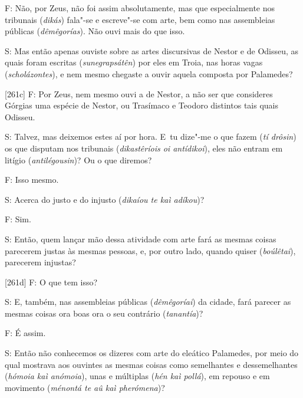  

F: Não, por Zeus, não foi assim absolutamente, mas que especialmente nos
tribunais (\emph{dikás}) fala"-se e escreve"-se com arte, bem como nas
assembleias públicas (\emph{dêmêgorías}). Não ouvi mais do que isso.

 

S: Mas então apenas ouviste sobre as artes discursivas de Nestor e de
Odisseu, as quais foram escritas (\emph{sunegrapsátên}) por eles em
Troia, nas horas vagas (\emph{scholázontes}), e nem mesmo chegaste a
ouvir aquela composta por Palamedes?

 

[261c] F: Por Zeus, nem mesmo ouvi a de Nestor, a não ser que
consideres Górgias uma espécie de Nestor, ou Trasímaco e Teodoro
distintos tais quais Odisseu.

 

S: Talvez, mas deixemos estes aí por hora. E~tu dize"-me o que fazem
(\emph{tí drôsin}) os que disputam nos tribunais (\emph{dikastêríois oi
antídikoi}), eles não entram em litígio (\emph{antilégousin})? Ou o que
diremos?

 

F: Isso mesmo.

 

S: Acerca do justo e do injusto (\emph{dikaíou te kaì adíkou})?

 

F: Sim.

 

S: Então, quem lançar mão dessa atividade com arte fará as mesmas coisas
parecerem justas às mesmas pessoas, e, por outro lado, quando quiser
(\emph{boúlêtai}), parecerem injustas?

 

[261d] F: O que tem isso?

 

S: E, também, nas assembleias públicas (\emph{dêmêgoríai}) da cidade,
fará parecer as mesmas coisas ora boas ora o seu contrário
(\emph{tanantía})?

 

F: É assim.

 

S: Então não conhecemos os dizeres com arte do eleático Palamedes, por
meio do qual mostrava aos ouvintes as mesmas coisas como semelhantes e
dessemelhantes (\emph{hómoia kaì anómoia}), unas e múltiplas (\emph{hén
kaì pollá}), em repouso e em movimento (\emph{ménontá te aû kaì
pherómena})?

 


